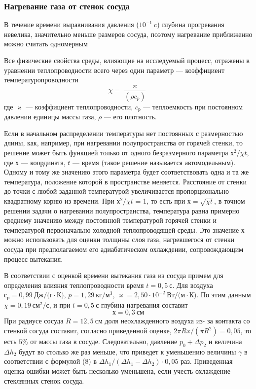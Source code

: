 \documentclass[a4paper,12pt]{article}
\theoremstyle{plain} %
\theoremstyle{definition} %
\theoremstyle{remark} %
\begin{document}
\subsubsection{Нагревание газа от стенок сосуда}
В течение времени выравнивания давления ($10^{-1}\ \text{c}$) глубина прогревания невелика, значительно меньше размеров сосуда, поэтому нагревание приближенно можно считать одномерным

Все физические свойства среды, влияющие на исследуемый процесс, отражены в уравнении теплопроводности всего через один параметр — коэффициент температуропроводности 
\begin{equation}
\chi = \frac{\varkappa}{(\rho c_p)}
\end{equation}
где $\varkappa$ — коэффициент теплопроводности, $c_р$ — теплоемкость при постоянном давлении единицы массы газа, $\rho$ — его плотность.

Если в начальном распределении температуры нет постоянных с размерностью длины, как, например, при нагревании полупространства от горячей стенки, то решение может быть функцией только от одного безразмерного параметра $х^2/\chi t$, где $х$ — координата, $t$ — время (такое решение называется автомодельным). Одному и тому же значению этого параметра будет соответствовать одна и та же температура, положение которой в пространстве меняется. Расстояние от стенки до точки с любой заданной температурой увеличивается пропорционально квадратному корню из времени. При $х^2/\chi t$ = 1, то есть при $х = \sqrt{\chi t}$, в точном решении задачи о нагревании полупространства, температура равна примерно среднему значению между постоянной температурой горячей стенки и температурой первоначально холодной теплопроводящей среды. Это значение $х$ можно использовать для оценки толщины слоя газа, нагревшегося от стенки сосуда при предполагаемом его адиабатическом охлаждении, сопровождающим процесс вытекания.

В соответствии с оценкой времени вытекания газа из сосуда примем для определения влияния теплопроводности время $t = 0,5\ \text{с}$. Для воздуха $с_р = 0,99\ \text{Дж}/\text{(г}\cdot\text{К)}$, $p = 1,29\ \text{кг}/\text{м}^3$, $\varkappa = 2,50 \cdot 10^{-2}\ \text{Вт}/\text{(м}\cdot\text{К)}$. По этим данным $\chi = 0,19\  \text{см}^2/\text{с}$, и при $t = 0,5\ \text{с}$ глубина нагревания составит 
\[х = 0,3\ \text{см}\]
При радиусе сосуда $R = 12,5\ \text{см}$ доля неохлажденного воздуха из- за контакта со стенкой сосуда составит, согласно приведенной оценке, $2\pi Rx/(\pi R^2) = 0,05$, то есть $5\%$ от массы газа в сосуде. Следовательно, давление $p_0 + \Delta p_2$ и величина $\Delta h_2$ будут во столько же раз меньше, что приведет к уменьшению величины $\gamma$ в соответствии с формулой (8) в $\Delta h_1/(\Delta h_1 - \Delta h_2) \cdot 0,05$ раз. Приведенная оценка ошибки может быть несколько уменьшена, если учесть охлаждение стеклянных стенок сосуда.
\end{document}
